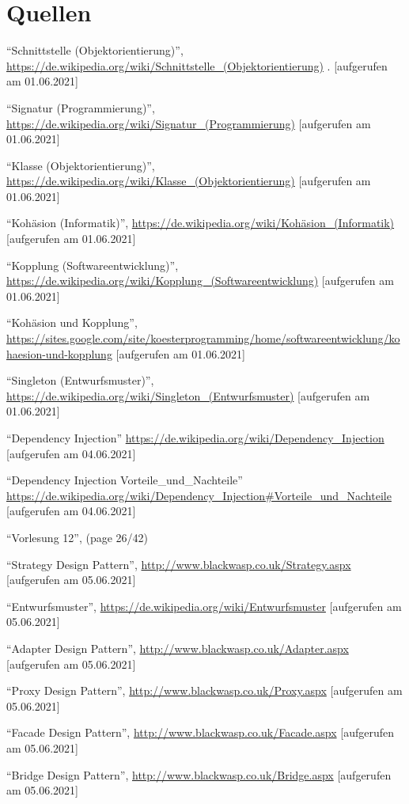 \section{Quellen}
\begin{enumerate}[{[1]}]
    \item ``Schnittstelle (Objektorientierung)'', \url{https://de.wikipedia.org/wiki/Schnittstelle_(Objektorientierung)} .
[aufgerufen am 01.06.2021]
    \item ``Signatur (Programmierung)'', \url{https://de.wikipedia.org/wiki/Signatur_(Programmierung)} [aufgerufen am 01.06.2021]
    \item ``Klasse (Objektorientierung)'', \url{https://de.wikipedia.org/wiki/Klasse_(Objektorientierung)} [aufgerufen am 01.06.2021]
    \item ``Kohäsion (Informatik)'', \url{https://de.wikipedia.org/wiki/Kohäsion_(Informatik)} [aufgerufen am 01.06.2021]
    \item ``Kopplung (Softwareentwicklung)'', \url{https://de.wikipedia.org/wiki/Kopplung_(Softwareentwicklung)} [aufgerufen am 01.06.2021]
    \item ``Kohäsion und Kopplung'', \url{https://sites.google.com/site/koesterprogramming/home/softwareentwicklung/kohaesion-und-kopplung} [aufgerufen am 01.06.2021]
    \item ``Singleton (Entwurfsmuster)'', \url{https://de.wikipedia.org/wiki/Singleton_(Entwurfsmuster)} [aufgerufen am 01.06.2021]
    \item ``Dependency Injection''
    \url{https://de.wikipedia.org/wiki/Dependency_Injection} [aufgerufen am 04.06.2021]    
    \item ``Dependency Injection Vorteile\_und\_Nachteile''
    \url{https://de.wikipedia.org/wiki/Dependency_Injection#Vorteile_und_Nachteile} [aufgerufen am 04.06.2021]
    \item ``Vorlesung 12'', (page 26/42) 
    \item ``Strategy Design Pattern'', 
    \url{http://www.blackwasp.co.uk/Strategy.aspx} [aufgerufen am 05.06.2021]
    \item ``Entwurfsmuster'', 
    \url{https://de.wikipedia.org/wiki/Entwurfsmuster} [aufgerufen am 05.06.2021]
    \item ``Adapter Design Pattern'', 
    \url{http://www.blackwasp.co.uk/Adapter.aspx} [aufgerufen am 05.06.2021]
    \item ``Proxy Design Pattern'', 
    \url{http://www.blackwasp.co.uk/Proxy.aspx} [aufgerufen am 05.06.2021]
    \item ``Facade Design Pattern'', 
    \url{http://www.blackwasp.co.uk/Facade.aspx} [aufgerufen am 05.06.2021]
    \item ``Bridge Design Pattern'', 
    \url{http://www.blackwasp.co.uk/Bridge.aspx} [aufgerufen am 05.06.2021]
    

\end{enumerate}


